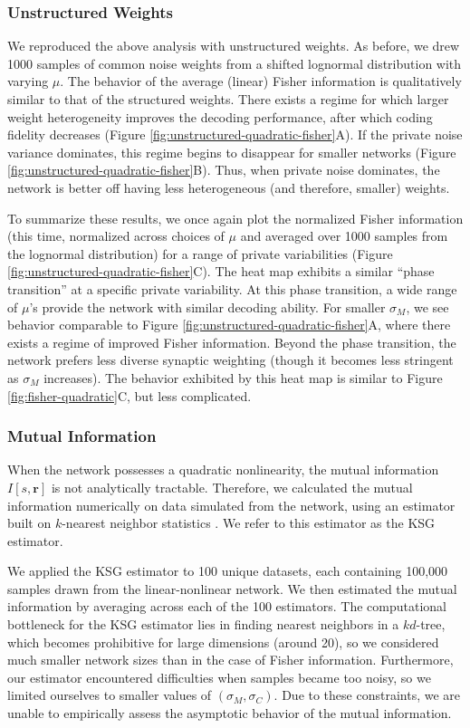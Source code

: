 \documentclass[12pt]{article}
\begin{document}
	\subsubsection{Unstructured Weights}
	We reproduced the above analysis with unstructured weights. As before, we drew   1000 samples of common noise weights from a shifted lognormal distribution with varying $\mu$. The behavior of the average (linear) Fisher information is qualitatively similar to that of the structured weights. There exists a regime for which larger weight heterogeneity improves the decoding performance, after which coding fidelity decreases (Figure \ref{fig:unstructured-quadratic-fisher}A). If the private noise variance dominates, this regime begins to disappear for smaller networks (Figure \ref{fig:unstructured-quadratic-fisher}B). Thus, when private noise dominates, the network is better off having less heterogeneous (and therefore, smaller) weights.
	
	To summarize these results, we once again plot the normalized Fisher information (this time, normalized across choices of $\mu$ and averaged over 1000 samples from the lognormal distribution) for a range of private variabilities (Figure \ref{fig:unstructured-quadratic-fisher}C).  The heat map exhibits a similar ``phase transition'' at a specific private variability. At this phase transition, a wide range of $\mu$'s provide the network with similar decoding ability. For smaller $\sigma_M$, we see behavior comparable to Figure \ref{fig:unstructured-quadratic-fisher}A, where there exists a regime of improved Fisher information. Beyond the phase transition, the network prefers less diverse synaptic weighting (though it becomes less stringent as $\sigma_M$ increases). The behavior exhibited by this heat map is similar to Figure \ref{fig:fisher-quadratic}C, but less complicated. 
	
	\subsubsection{Mutual Information}
	When the network possesses a quadratic nonlinearity, the mutual information $I[s,\mathbf{r}]$ is not analytically tractable. Therefore, we calculated the mutual information numerically on data simulated from the network, using an estimator built on $k$-nearest neighbor statistics \citep{kraskov2004}. We refer to this estimator as the KSG estimator. 
	
	We applied the KSG estimator to 100 unique datasets, each containing 100,000 samples drawn from the linear-nonlinear network. We then estimated the mutual information by averaging across each of the 100 estimators. The computational bottleneck for the KSG estimator lies in finding nearest neighbors in a $kd$-tree, which becomes prohibitive for large dimensions (around 20), so we considered much smaller network sizes than in the case of Fisher information. Furthermore, our estimator encountered difficulties when samples became too noisy, so we limited ourselves to smaller values of $(\sigma_M, \sigma_C)$. Due to these constraints, we are unable to empirically assess the asymptotic behavior of the mutual information.
	
\end{document}
